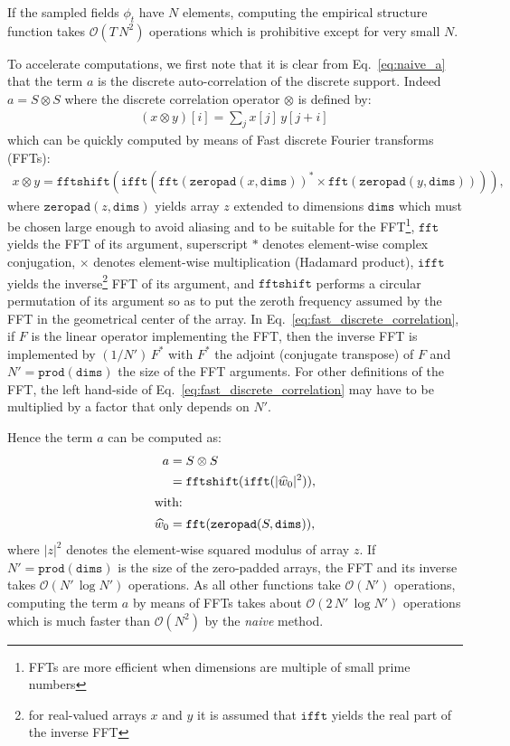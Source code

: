 \documentclass{article}
\begin{document}
If the sampled fields $\phi_{t}$ have $N$ elements, computing the empirical
structure function takes $\mathcal{O}(T\,N^{2})$ operations which is
prohibitive except for very small $N$.

To accelerate computations, we first note that it is clear from
Eq.~\eqref{eq:naive_a} that the term $a$ is the discrete auto-correlation of
the discrete support. Indeed $a = S \otimes S$ where the discrete correlation
operator $\otimes$ is defined by:
\begin{align}
  \label{eq:discrete_correlation}
  (x \otimes y)[i] = \sum\nolimits_{j} x[j]\,y[j+i]\,
\end{align}
which can be quickly computed by means of Fast discrete Fourier transforms
(FFTs):
\begin{align}
  \label{eq:fast_discrete_correlation}
  x \otimes y = \mathtt{fftshift}(\mathtt{ifft}(
  \mathtt{fft}(\mathtt{zeropad}(x, \mathtt{dims}))^{*} \times
  \mathtt{fft}(\mathtt{zeropad}(y, \mathtt{dims})))),
\end{align}
where $\mathtt{zeropad}(z, \mathtt{dims})$ yields array $z$ extended to
dimensions $\mathtt{dims}$ which must be chosen large enough to avoid aliasing
and to be suitable for the FFT\footnote{FFTs are more efficient when dimensions
  are multiple of small prime numbers}, $\mathtt{fft}$ yields the FFT of its
argument, superscript $*$ denotes element-wise complex conjugation, $\times$
denotes element-wise multiplication (Hadamard product), $\mathtt{ifft}$ yields
the inverse\footnote{for real-valued arrays $x$ and $y$ it is assumed that
  $\mathtt{ifft}$ yields the real part of the inverse FFT} FFT of its argument,
and $\mathtt{fftshift}$ performs a circular permutation of its argument so as
to put the zeroth frequency assumed by the FFT in the geometrical center of the
array. In Eq.~\eqref{eq:fast_discrete_correlation}, if $F$ is the linear
operator implementing the FFT, then the inverse FFT is implemented by
$(1/N')\,F^{*}$ with $F^{*}$ the adjoint (conjugate transpose) of $F$ and
$N' = \mathtt{prod}(\mathtt{dims})$ the size of the FFT arguments. For other
definitions of the FFT, the left hand-side of
Eq.~\eqref{eq:fast_discrete_correlation} may have to be multiplied by a factor
that only depends on $N'$.

Hence the term $a$  can be computed as:
\begin{align}
  a
  &= S \otimes S\\
  \label{eq:fast_a}
  &= \mathtt{fftshift}(\mathtt{ifft}(|\widehat{w}_{0}|^{2})), \\
  \intertext{with:}
  \widehat{w}_{0} &= \mathtt{fft}(\mathtt{zeropad}(S, \mathtt{dims})),
\end{align}
where $|z|^{2}$ denotes the element-wise squared modulus of array $z$. If
$N' = \mathtt{prod}(\mathtt{dims})$ is the size of the zero-padded arrays, the
FFT and its inverse takes $\mathcal{O}(N'\,\log N')$ operations. As all other
functions take $\mathcal{O}(N')$ operations, computing the term $a$ by means of
FFTs takes about $\mathcal{O}(2\,N'\,\log N')$ operations which is much faster
than $\mathcal{O}(N^{2})$ by the \emph{naive} method.
\end{document}
